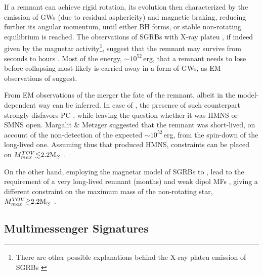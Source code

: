 If a remnant can achieve rigid rotation, its evolution then characterized by the emission 
of \acp{GW} (due to residual asphericity) and magnetic braking, reducing further its 
angular momentum, until either \ac{BH} forms, or stable non-rotating equilibrium is reached.
The observations of \acp{SGRB} with X-ray plateu \cite{109,110,111}, if indeed given by the 
magnetar activity\footnote{
    There are other possible explanations behind the X-ray plateu emission of \acp{SGRB} 
    \cite{113}
}, suggest that the remnant may survive from seconds to hours \cite{111, 112}.
Most of the energy, ${\sim}10^{52}\,$erg, that a remnant needs to lose before collapsing 
most likely is carried away in a form of \acp{GW}, as \ac{EM} observations of \GW{} suggest.

From \ac{EM} observations of the merger the fate of the remnant, albeit in the 
model-dependent way can be inferred. In case of \GW{}, the presence of such counterpart 
strongly disfavors \ac{PC} \cite{103,101,62}, while leaving the question whether it was 
\ac{HMNS} or \ac{SMNS} open. Margalit \& Metzger \cite{103} suggested that the remnant 
was short-lived, on account of the non-detection of the expected ${\sim}10^{52}\,$erg, 
from the spin-down of the long-lived one. Assuming thus that \GW{} produced \ac{HMNS}, 
constraints can be placed on $M_{max}^{TOV}{\lesssim}2.2{\text{M}_{\odot}}$ \cite{103}.

On the other hand, employing the magnetar model of \acp{SGRB} to \GW{} \cite{115,116,117},
lead to the requirement of a very long-lived remnant (months) and weak dipol \acp{MF} \cite{115},
giving a different constraint on the maximum mass of the non-rotating star, 
$M_{max}^{TOV}{\gtrsim}2.2{\text{M}_{\odot}}$ 
. 



\subsection{Multimessenger Signatures} %

